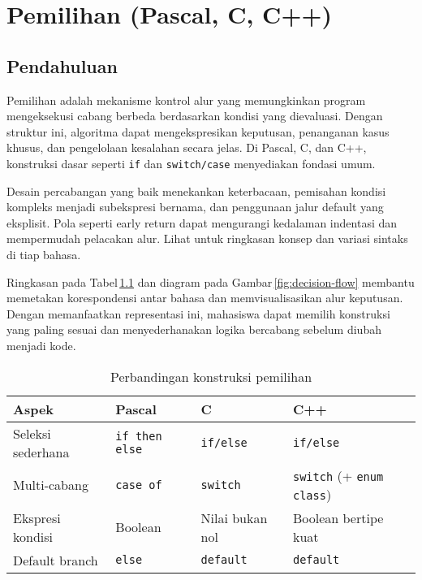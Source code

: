 \documentclass[../main.tex]{subfiles}
\begin{document}
\chapter{Pemilihan (Pascal, C, C++)}
\section{Pendahuluan}
Pemilihan adalah mekanisme kontrol alur yang memungkinkan program mengeksekusi cabang berbeda berdasarkan kondisi yang dievaluasi. Dengan struktur ini, algoritma dapat mengekspresikan keputusan, penanganan kasus khusus, dan pengelolaan kesalahan secara jelas. Di Pascal, C, dan C++, konstruksi dasar seperti \texttt{if} dan \texttt{switch/case} menyediakan fondasi umum.

Desain percabangan yang baik menekankan keterbacaan, pemisahan kondisi kompleks menjadi subekspresi bernama, dan penggunaan jalur default yang eksplisit. Pola seperti early return dapat mengurangi kedalaman indentasi dan mempermudah pelacakan alur. Lihat \textcite{pascal-tutorial-wikibooks,gnu-c-manual,cpp-reference} untuk ringkasan konsep dan variasi sintaks di tiap bahasa.

Ringkasan pada Tabel\,\ref{tab:pilih-perbandingan} dan diagram pada Gambar\,\ref{fig:decision-flow} membantu memetakan korespondensi antar bahasa dan memvisualisasikan alur keputusan. Dengan memanfaatkan representasi ini, mahasiswa dapat memilih konstruksi yang paling sesuai dan menyederhanakan logika bercabang sebelum diubah menjadi kode.

\begin{table}[h]
  \centering
  \caption{Perbandingan konstruksi pemilihan}
  \label{tab:pilih-perbandingan}
  \begin{tabular}{@{}llll@{}}
    \toprule
    Aspek & Pascal & C & C++ \\
    \midrule
    Seleksi sederhana & \texttt{if then else} & \texttt{if/else} & \texttt{if/else} \\
    Multi-cabang & \texttt{case of} & \texttt{switch} & \texttt{switch} (+ \texttt{enum class}) \\
    Ekspresi kondisi & Boolean & Nilai bukan nol & Boolean bertipe kuat \\
    Default branch & \texttt{else} & \texttt{default} & \texttt{default} \\
    \bottomrule
  \end{tabular}
\end{table}
\end{document}
